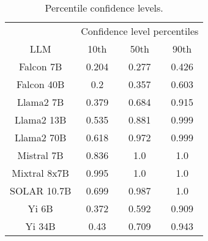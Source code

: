 \begin{table*}
\centering
\begin{tabular}{c|c|c|c}
& \multicolumn{3}{c}{Confidence level percentiles} \\ 
LLM & 10th & 50th & 90th\\ \hline
Falcon 7B & 0.204 & 0.277 & 0.426\\
Falcon 40B & 0.2 & 0.357 & 0.603\\
Llama2 7B & 0.379 & 0.684 & 0.915\\
Llama2 13B & 0.535 & 0.881 & 0.999\\
Llama2 70B & 0.618 & 0.972 & 0.999\\
Mistral 7B & 0.836 & 1.0 & 1.0\\
Mixtral 8x7B & 0.995 & 1.0 & 1.0\\
SOLAR 10.7B & 0.699 & 0.987 & 1.0\\
Yi 6B & 0.372 & 0.592 & 0.909\\
Yi 34B & 0.43 & 0.709 & 0.943\\
\hline
\end{tabular}
\caption{Percentile confidence levels.}
\label{tab:percentile_conf}
\end{table*}
